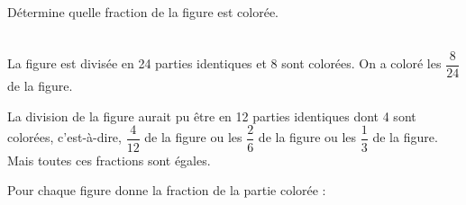 \begin{methode*1}

\begin{exemple*1}
\begin{minipage}[c]{0.4\linewidth}
Détermine quelle fraction de la figure est colorée.
 \end{minipage} \hfill%
 \begin{minipage}[c]{0.4\linewidth}
 
 \end{minipage} \\[1em]
La figure est divisée en 24 parties identiques et 8 sont colorées. On a coloré les $\dfrac{8}{24}$ de la figure.
 \end{exemple*1}
 
\begin{remarque}
La division de la figure aurait pu être en 12 parties identiques dont 4 sont colorées, c'est-à-dire, $\dfrac{4}{12}$ de la figure ou les $\dfrac{2}{6}$ de la figure ou les $\dfrac{1}{3}$ de la figure. Mais toutes ces fractions sont égales.
 \end{remarque}

  \exercice
Pour chaque figure donne la fraction de la partie colorée :
\begin{colenumerate}{3}
 \item 
 
 
 \item 
 

 \item 
 
 
 \end{colenumerate}  

 \end{methode*1}


